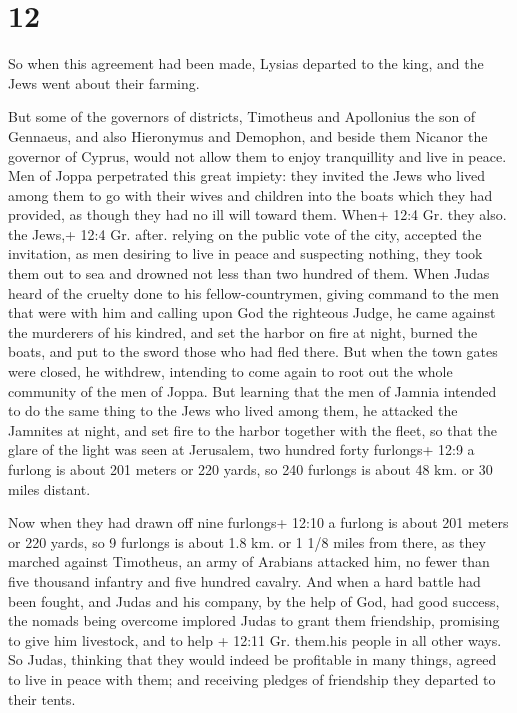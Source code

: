 \hypertarget{section-10}{%
\section{12}\label{section-10}}

 So when this agreement had been made, Lysias departed to
the king, and the Jews went about their farming.

 But some of the governors of districts, Timotheus and
Apollonius the son of Gennaeus, and also Hieronymus and Demophon, and
beside them Nicanor the governor of Cyprus, would not allow them to
enjoy tranquillity and live in peace.  Men of Joppa
perpetrated this great impiety: they invited the Jews who lived among
them to go with their wives and children into the boats which they had
provided, as though they had no ill will toward them.  When+
12:4 Gr. they also. the Jews,+ 12:4 Gr. after. relying on the public
vote of the city, accepted the invitation, as men desiring to live in
peace and suspecting nothing, they took them out to sea and drowned not
less than two hundred of them.  When Judas heard of the
cruelty done to his fellow-countrymen, giving command to the men that
were with him  and calling upon God the righteous Judge, he
came against the murderers of his kindred, and set the harbor on fire at
night, burned the boats, and put to the sword those who had fled there.
 But when the town gates were closed, he withdrew, intending
to come again to root out the whole community of the men of Joppa.
 But learning that the men of Jamnia intended to do the same
thing to the Jews who lived among them,  he attacked the
Jamnites at night, and set fire to the harbor together with the fleet,
so that the glare of the light was seen at Jerusalem, two hundred forty
furlongs+ 12:9 a furlong is about 201 meters or 220 yards, so 240
furlongs is about 48 km. or 30 miles distant.

 Now when they had drawn off nine furlongs+ 12:10 a furlong
is about 201 meters or 220 yards, so 9 furlongs is about 1.8 km. or 1
1/8 miles from there, as they marched against Timotheus, an army of
Arabians attacked him, no fewer than five thousand infantry and five
hundred cavalry.  And when a hard battle had been fought,
and Judas and his company, by the help of God, had good success, the
nomads being overcome implored Judas to grant them friendship, promising
to give him livestock, and to help + 12:11 Gr. them.his people in all
other ways.  So Judas, thinking that they would indeed be
profitable in many things, agreed to live in peace with them; and
receiving pledges of friendship they departed to their tents.

